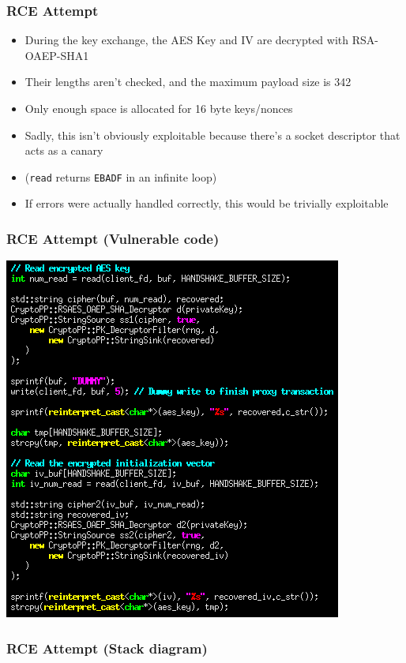 \documentclass{beamer}
\begin{document}
\begin{frame}[fragile]
\frametitle{RCE Attempt}
\begin{itemize}
\item During the key exchange, the AES Key and IV are decrypted with RSA-OAEP-SHA1
\item Their lengths aren't checked, and the maximum payload size is 342
\item Only enough space is allocated for 16 byte keys/nonces
\item Sadly, this isn't obviously exploitable because there's a socket descriptor that acts as a canary
\item (\verb|read| returns \verb|EBADF| in an infinite loop)
\item If errors were actually handled correctly, this would be trivially exploitable
\end{itemize}
\end{frame}
\begin{frame}[fragile]
\frametitle{RCE Attempt (Vulnerable code)}
\includegraphics[height=0.8\textheight]{bankscreenshot_cropped.png}
\end{frame}

\begin{frame}[fragile]
\frametitle{RCE Attempt (Stack diagram)}
\begin{tikzpicture}[scale=0.45, every node/.style={scale=0.45}]

\end{tikzpicture}
\end{frame}
\end{document}
